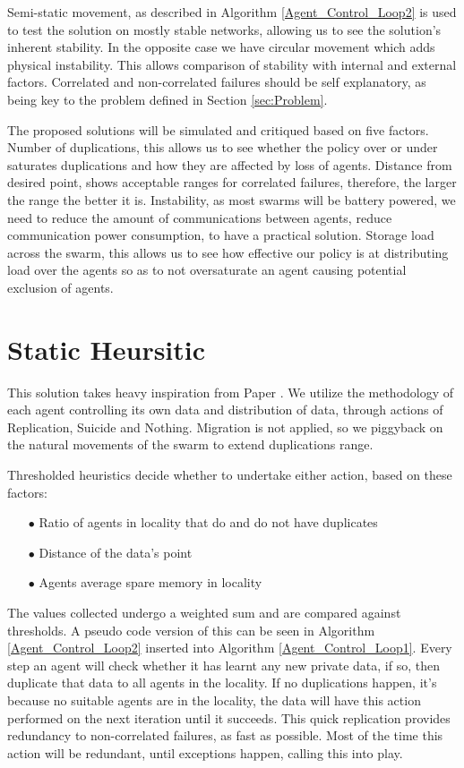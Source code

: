 \documentclass{UoYCSproject}
\begin{document}
Semi-static movement, as described in Algorithm \ref{Agent_Control_Loop2} is used to test the solution on mostly stable networks, allowing us to see the solution's inherent stability.
In the opposite case we have circular movement which adds physical instability.
This allows comparison of stability with internal and external factors.
Correlated and non-correlated failures should be self explanatory, as being key to the problem defined in Section \ref{sec:Problem}.

The proposed solutions will be simulated and critiqued based on five factors.
Number of duplications, this allows us to see whether the policy over or under saturates duplications and how they are affected by loss of agents.
Distance from desired point, shows acceptable ranges for correlated failures, therefore, the larger the range the better it is.
Instability, as most swarms will be battery powered, we need to reduce the amount of communications between agents, reduce communication power consumption, to have a practical solution.
Storage load across the swarm, this allows us to see how effective our policy is at distributing load over the agents so as to not oversaturate an agent causing potential exclusion of agents.


\section{Static Heursitic}
\label{sec:Simple2}

This solution takes heavy inspiration from Paper \cite{Distributed Storage}.
We utilize the methodology of each agent controlling its own data and distribution of data, through actions of Replication, Suicide and Nothing.
Migration is not applied, so we piggyback on the natural movements of the swarm to extend duplications range.

Thresholded heuristics decide whether to undertake either action, based on these factors:

\begin{itemize}
\itemsep-1em
\item[$\bullet$] Ratio of agents in locality that do and do not have duplicates
\item[$\bullet$] Distance of the data’s point
\item[$\bullet$] Agents average spare memory in locality
\end{itemize}

The values collected undergo a weighted sum and are compared against thresholds.
A pseudo code version of this can be seen in Algorithm \ref{Agent_Control_Loop2} inserted into Algorithm \ref{Agent_Control_Loop1}.
Every step an agent will check whether it has learnt any new private data, if so, then duplicate that data to all agents in the locality.
If no duplications happen, it’s because no suitable agents are in the locality, the data will have this action performed on the next iteration until it succeeds.
This quick replication provides redundancy to non-correlated failures, as fast as possible.
Most of the time this action will be redundant, until exceptions happen, calling this into play.
\end{document}
